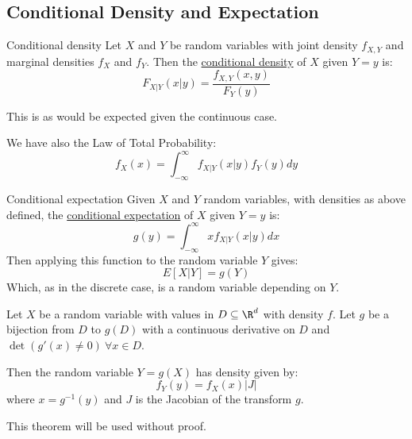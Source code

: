 \documentclass[../Main.tex]{subfiles}
\begin{document}
\subsection{Conditional Density and Expectation}
\begin{definition}{Conditional density}
    Let $X$ and $Y$ be random variables with joint density $f_{X, Y}$ and marginal densities $f_X$ and $f_Y$. Then the \underline{conditional density} of $X$ given $Y = y$ is:
    \begin{equation*}
        F_{X | Y}(x | y) = \frac{f_{X, Y}(x, y)}{F_Y(y)}
    \end{equation*}
\end{definition}
This is as would be expected given the continuous case.\par
We have also the Law of Total Probability:
\begin{equation*}
    f_X(x) = \int_{-\infty}^\infty f_{X | Y}(x | y) f_Y(y) dy
\end{equation*}
\begin{definition}{Conditional expectation}
    Given $X$ and $Y$ random variables, with densities as above defined, the \underline{conditional expectation} of $X$ given $Y = y$ is:
    \begin{equation*}
        g(y) = \int_{-\infty}^\infty xf_{X | Y} (x | y) dx
    \end{equation*}
    Then applying this function to the random variable $Y$ gives:
    \begin{equation*}
        E[X | Y] = g(Y)
    \end{equation*}
    Which, as in the discrete case, is a random variable depending on $Y$.
\end{definition}
\begin{theorem}
    Let $X$ be a random variable with values in $D \subseteq \R^d$ with density $f$. Let $g$ be a bijection from $D$ to $g(D)$ with a continuous derivative on $D$ and $\det{(g'(x) \neq 0)}~\forall x \in D$.\par
    Then the random variable $Y = g(X)$ has density given by:
    \begin{equation*}
        f_Y(y) = f_X(x) |J|
    \end{equation*}
    where $x = g^{-1}(y)$ and $J$ is the Jacobian of the transform $g$.
    \label{thmTransformRV}
\end{theorem}
This theorem will be used without proof.
\end{document}
